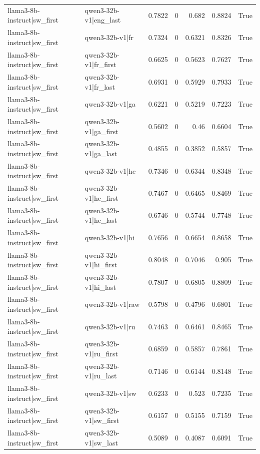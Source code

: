 \begin{table}
\begin{tabular}{l l r r r r l}
llama3-8b-instruct|sw_first & qwen3-32b-v1|eng_last & 0.7822 & 0 & 0.682 & 0.8824 & True \\
llama3-8b-instruct|sw_first & qwen3-32b-v1|fr & 0.7324 & 0 & 0.6321 & 0.8326 & True \\
llama3-8b-instruct|sw_first & qwen3-32b-v1|fr_first & 0.6625 & 0 & 0.5623 & 0.7627 & True \\
llama3-8b-instruct|sw_first & qwen3-32b-v1|fr_last & 0.6931 & 0 & 0.5929 & 0.7933 & True \\
llama3-8b-instruct|sw_first & qwen3-32b-v1|ga & 0.6221 & 0 & 0.5219 & 0.7223 & True \\
llama3-8b-instruct|sw_first & qwen3-32b-v1|ga_first & 0.5602 & 0 & 0.46 & 0.6604 & True \\
llama3-8b-instruct|sw_first & qwen3-32b-v1|ga_last & 0.4855 & 0 & 0.3852 & 0.5857 & True \\
llama3-8b-instruct|sw_first & qwen3-32b-v1|he & 0.7346 & 0 & 0.6344 & 0.8348 & True \\
llama3-8b-instruct|sw_first & qwen3-32b-v1|he_first & 0.7467 & 0 & 0.6465 & 0.8469 & True \\
llama3-8b-instruct|sw_first & qwen3-32b-v1|he_last & 0.6746 & 0 & 0.5744 & 0.7748 & True \\
llama3-8b-instruct|sw_first & qwen3-32b-v1|hi & 0.7656 & 0 & 0.6654 & 0.8658 & True \\
llama3-8b-instruct|sw_first & qwen3-32b-v1|hi_first & 0.8048 & 0 & 0.7046 & 0.905 & True \\
llama3-8b-instruct|sw_first & qwen3-32b-v1|hi_last & 0.7807 & 0 & 0.6805 & 0.8809 & True \\
llama3-8b-instruct|sw_first & qwen3-32b-v1|raw & 0.5798 & 0 & 0.4796 & 0.6801 & True \\
llama3-8b-instruct|sw_first & qwen3-32b-v1|ru & 0.7463 & 0 & 0.6461 & 0.8465 & True \\
llama3-8b-instruct|sw_first & qwen3-32b-v1|ru_first & 0.6859 & 0 & 0.5857 & 0.7861 & True \\
llama3-8b-instruct|sw_first & qwen3-32b-v1|ru_last & 0.7146 & 0 & 0.6144 & 0.8148 & True \\
llama3-8b-instruct|sw_first & qwen3-32b-v1|sw & 0.6233 & 0 & 0.523 & 0.7235 & True \\
llama3-8b-instruct|sw_first & qwen3-32b-v1|sw_first & 0.6157 & 0 & 0.5155 & 0.7159 & True \\
llama3-8b-instruct|sw_first & qwen3-32b-v1|sw_last & 0.5089 & 0 & 0.4087 & 0.6091 & True \\

\end{tabular}
\end{table}
